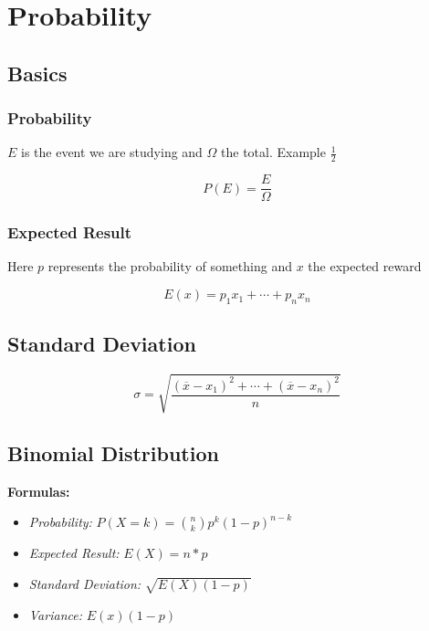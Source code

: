 \newpage
\section{Probability}

\subsection{Basics}

\subsubsection{Probability}

\(E\) is the event we are studying and \(\Omega\) the total. Example \(\frac{1}{2}\)

\[
    P(E) = \frac{E}{\Omega}
\]

\subsubsection{Expected Result}

Here \(p\) represents the probability of something and \(x\) the expected reward

\[
    E(x) = p_1 x_1 + \cdots + p_n x_n
\]

\subsection{Standard Deviation}

\[
    \sigma = \sqrt{ \frac{ {(\overline{x} - x_1)}^2 + \cdots + {(\overline{x} - x_n)}^2 }{ n } }
\]

\subsection{Binomial Distribution}

\textbf{Formulas:}

\begin{itemize}

    \item \emph{Probability: } \(P(X = k) = \binom{n}{k} p^k {(1 - p)}^{n - k}\)

    \item \emph{Expected Result: } \(E(X) = n * p\)

    \item \emph{Standard Deviation: } \(\sqrt{E(X)(1-p)}\)

    \item  \emph{Variance: } \(E(x)(1-p)\)

\end{itemize}

